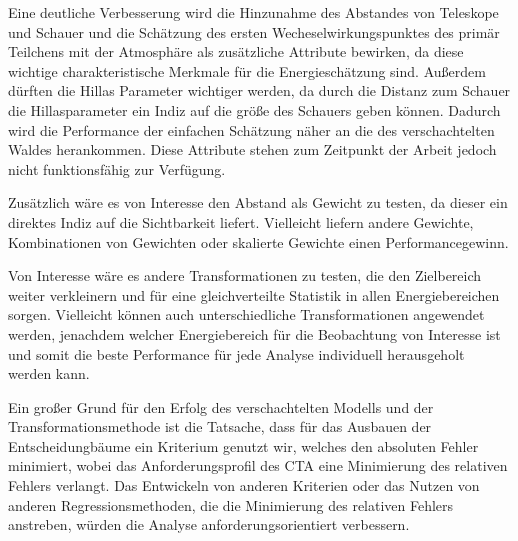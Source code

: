 Eine deutliche Verbesserung wird die Hinzunahme des Abstandes von Teleskope und Schauer und die Schätzung des ersten
Wecheselwirkungspunktes des primär Teilchens mit der Atmosphäre als zusätzliche Attribute bewirken, da diese wichtige
charakteristische Merkmale für die Energieschätzung sind. Außerdem dürften die Hillas Parameter wichtiger werden, da durch
die Distanz zum Schauer die Hillasparameter ein Indiz auf die größe des Schauers geben können.
Dadurch wird die Performance der einfachen Schätzung näher an die des verschachtelten Waldes herankommen.
Diese Attribute stehen zum Zeitpunkt der Arbeit jedoch nicht funktionsfähig zur Verfügung.

Zusätzlich wäre es von Interesse den Abstand als Gewicht zu testen, da dieser ein direktes Indiz auf die Sichtbarkeit
liefert.
Vielleicht liefern andere Gewichte, Kombinationen von Gewichten oder skalierte Gewichte einen Performancegewinn.

Von Interesse wäre es andere Transformationen zu testen, die den Zielbereich weiter verkleinern und für eine gleichverteilte
Statistik in allen Energiebereichen sorgen.
Vielleicht können auch unterschiedliche Transformationen angewendet werden, jenachdem welcher Energiebereich für die
Beobachtung von Interesse ist und somit die beste Performance für jede Analyse individuell herausgeholt werden kann.

Ein großer Grund für den Erfolg des verschachtelten Modells und der Transformationsmethode ist die Tatsache, dass für das
Ausbauen der Entscheidungbäume ein Kriterium genutzt wir, welches den absoluten Fehler minimiert, wobei das Anforderungsprofil des
CTA eine Minimierung des relativen Fehlers verlangt.
Das Entwickeln von anderen Kriterien oder das Nutzen von anderen Regressionsmethoden, die die Minimierung des relativen Fehlers
anstreben, würden die Analyse anforderungsorientiert verbessern.

